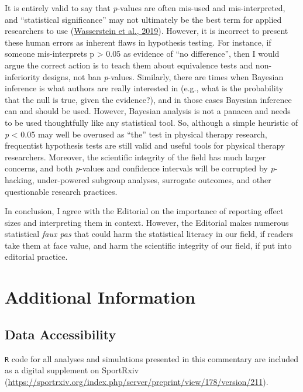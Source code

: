\documentclass[]{cik}%
\begin{document}
It is entirely valid to say that \emph{p}-values are often mis-used and
mis-interpreted, and ``statistical significance'' may not ultimately be
the best term for applied researchers to use
(\protect\hyperlink{ref-41}{Wasserstein et al., 2019}). However, it is
incorrect to present these human errors as inherent flaws in hypothesis
testing. For instance, if someone mis-interprets p \textgreater{} 0.05
as evidence of ``no difference'', then I would argue the correct action
is to teach them about equivalence tests and non-inferiority designs,
not ban \emph{p}-values. Similarly, there are times when Bayesian
inference is what authors are really interested in (e.g., what is the
probability that the null is true, given the evidence?), and in those
cases Bayesian inference can and should be used. However, Bayesian
analysis is not a panacea and needs to be used thoughtfully like any
statistical tool. So, although a simple heuristic of \emph{p}
\textless{} 0.05 may well be overused as ``the'' test in physical
therapy research, frequentist hypothesis tests are still valid and
useful tools for physical therapy researchers. Moreover, the scientific
integrity of the field has much larger concerns, and both
\emph{p}-values and confidence intervals will be corrupted by
\emph{p}-hacking, under-powered subgroup analyses, surrogate outcomes,
and other questionable research practices.

In conclusion, I agree with the Editorial on the importance of reporting
effect sizes and interpreting them in context. However, the Editorial
makes numerous statistical \emph{faux pas} that could harm the
statistical literacy in our field, if readers take them at face value,
and harm the scientific integrity of our field, if put into editorial
practice.

\newpage

\hypertarget{additional-information}{%
\section{Additional Information}\label{additional-information}}

\hypertarget{data-accessibility}{%
\subsection{Data Accessibility}\label{data-accessibility}}

\texttt{R} code for all analyses and simulations presented in this
commentary are included as a digital supplement on SportRxiv
(\url{https://sportrxiv.org/index.php/server/preprint/view/178/version/211}).
\end{document}
